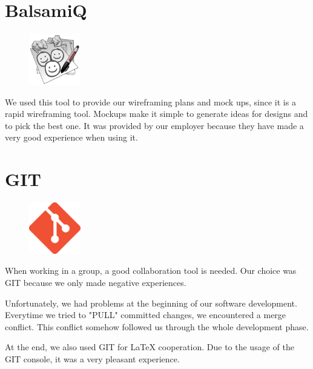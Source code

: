 \section{BalsamiQ}
\begin{figure}
  \begin{center}
    \includegraphics[width=0.2\textwidth] {bilder/balsamiq}
  \end{center}
\end{figure}
We used this tool to provide our wireframing plans and mock ups, since it is a rapid wireframing tool. Mockups make it simple to generate ideas for designs and to pick the best one. It was provided by our employer because they have made a very good experience when using it.

\section{GIT}
\begin{figure}
  \begin{center}
    \includegraphics[width=0.2\textwidth] {bilder/git}
  \end{center}
\end{figure}
When working in a group, a good collaboration tool is needed. Our choice was GIT because we only made negative experiences.

Unfortunately, we had problems at the beginning of our software development. Everytime we tried to "PULL" committed changes, we encountered a merge conflict. This conflict somehow followed us through the whole development phase.

At the end, we also used GIT for LaTeX cooperation. Due to the usage of the GIT console, it was a very pleasant experience.

